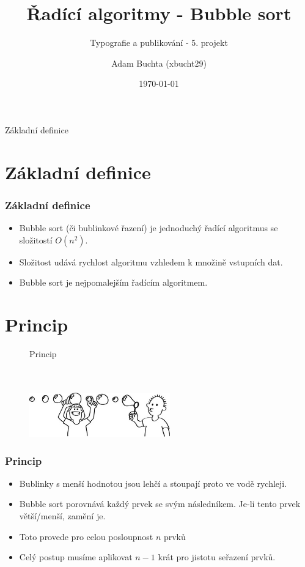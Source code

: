 \documentclass[11pt, hyperref={unicode}]{beamer}
\title{Řadící algoritmy - Bubble sort}
\subtitle{Typografie a publikování - 5. projekt}
\author{Adam Buchta (xbucht29)}
\date{\today}
\begin{document}
    \begin{frame}
        \titlepage
    \end{frame}

    \begin{frame}
        \tableofcontents
    \end{frame}

    \begin{frame}
        \centering
        {\color{blue!65!black!90!white}\Huge{Základní definice}}
    \end{frame}

    \section{Základní definice}
    \begin{frame}
        \frametitle{Základní definice}
        \begin{itemize}
          \item Bubble sort (či bublinkové řazení) je jednoduchý řadící algoritmus se \alert{složitostí} $O(n^2)$.
          \item Složitost udává rychlost algoritmu vzhledem k množině vstupních dat.
          \item Bubble sort je nejpomalejším řadícím algoritmem.
        \end{itemize}
    \end{frame}

    \section{Princip}
    \begin{frame}
          \begin{figure}
            \centering
            {\color{blue!65!black!90!white}\huge{Princip}}
                                \\~\
                                \\~\

            \includegraphics[width=230px]{BubbleSort.jpg}
          \end{figure}
    \end{frame}

    \begin{frame}
        \frametitle{Princip}
        \begin{itemize}
          \item Bublinky s menší hodnotou jsou lehčí a stoupají proto ve vodě rychleji.
          \item Bubble sort porovnává každý prvek se svým následníkem. Je-li tento prvek větší/menší, zamění je.
          \item Toto provede pro celou posloupnost \alert{$n$} prvků
          \item Celý postup musíme aplikovat \alert{$n-1$} krát pro jistotu seřazení prvků.
        \end{itemize}
    \end{frame}
\end{document}
